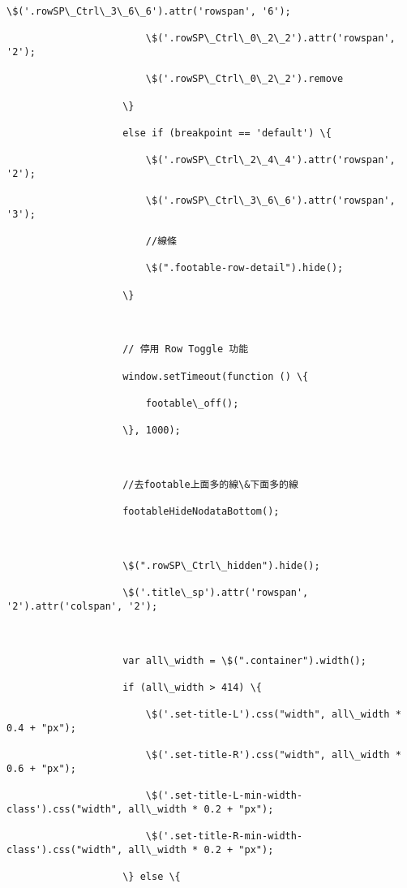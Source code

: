 \documentclass[11pt]{article}
\begin{document}
\begin{Verbatim}[commandchars=\\\{\}]
                        \$('.rowSP\_Ctrl\_3\_6\_6').attr('rowspan', '6');

                        \$('.rowSP\_Ctrl\_0\_2\_2').attr('rowspan', '2');

                        \$('.rowSP\_Ctrl\_0\_2\_2').remove

                    \}

                    else if (breakpoint == 'default') \{

                        \$('.rowSP\_Ctrl\_2\_4\_4').attr('rowspan', '2');

                        \$('.rowSP\_Ctrl\_3\_6\_6').attr('rowspan', '3');

                        //線條

                        \$(".footable-row-detail").hide();

                    \}



                    // 停用 Row Toggle 功能

                    window.setTimeout(function () \{

                        footable\_off();

                    \}, 1000);



                    //去footable上面多的線\&下面多的線

                    footableHideNodataBottom();



                    \$(".rowSP\_Ctrl\_hidden").hide();

                    \$('.title\_sp').attr('rowspan', '2').attr('colspan', '2');



                    var all\_width = \$(".container").width();

                    if (all\_width > 414) \{

                        \$('.set-title-L').css("width", all\_width * 0.4 + "px");

                        \$('.set-title-R').css("width", all\_width * 0.6 + "px");

                        \$('.set-title-L-min-width-class').css("width", all\_width * 0.2 + "px");

                        \$('.set-title-R-min-width-class').css("width", all\_width * 0.2 + "px");

                    \} else \{


\end{Verbatim}
\end{document}

